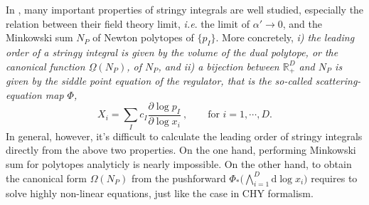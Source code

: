 \documentclass[12pt]{article}
\theoremstyle{definition}
\theoremstyle{plain}
\newcommand{\dif}{\mathrm{d}} %
\begin{document}

In \cite{}, many important properties of stringy integrals are well studied, especially the relation between their field theory limit, {\it{i.e}}. the limit of $\alpha'\to 0$, and the Minkowski sum $N_{P}$ of Newton polytopes of $\{p_I\}$.
More concretely, {\it{ i) the leading order of a stringy integral is given by the volume of the dual polytope, or the canonical function $\underline{\Omega}(N_{P})$, of $N_{P}$, and ii) a bijection between $\mathds{R}_{+}^{D}$ and $N_{P}$ is given by the siddle point equation of the regulator, that is the so-called scattering-equation map $\Phi$,}}
\begin{equation} \label{SEmap}
	X_{i}= \sum_{I}c_{I}\frac{\partial \log p_{I}}{\partial \log x_{i}}\:, \qquad  \text{for }i=1,\cdots,D.
\end{equation}	
In general, however, it's difficult to calculate the leading order of stringy integrals directly from the above two properties.
On the one hand, performing Minkowski sum for polytopes analyticly is nearly impossible. On the other hand, to obtain the canonical form $\Omega(N_{P})$ from the pushforward $\Phi_{\ast}\bigl(\bigwedge_{i=1}^{D} \dif \log x_{i}\bigr)$ requires to solve highly non-linear equations, just like the case in CHY formalism.
\end{document}
